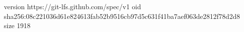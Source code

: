 version https://git-lfs.github.com/spec/v1
oid sha256:08c221036d61e824613fab52b9516cb97d5c631f41ba7aef063de2812f78d2d8
size 1918
